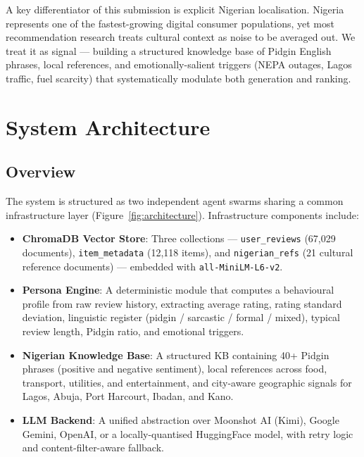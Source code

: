 \documentclass[11pt,a4paper]{article}
\begin{document}
A key differentiator of this submission is explicit Nigerian localisation. Nigeria represents one of the fastest-growing digital consumer populations, yet most recommendation research treats cultural context as noise to be averaged out. We treat it as signal — building a structured knowledge base of Pidgin English phrases, local references, and emotionally-salient triggers (NEPA outages, Lagos traffic, fuel scarcity) that systematically modulate both generation and ranking.

\section{System Architecture}

\subsection{Overview}

The system is structured as two independent agent swarms sharing a common infrastructure layer (Figure~\ref{fig:architecture}). Infrastructure components include:

\begin{itemize}[leftmargin=*]
    \item \textbf{ChromaDB Vector Store}: Three collections — \texttt{user\_reviews} (67,029 documents), \texttt{item\_metadata} (12,118 items), and \texttt{nigerian\_refs} (21 cultural reference documents) — embedded with \texttt{all-MiniLM-L6-v2}.
    \item \textbf{Persona Engine}: A deterministic module that computes a behavioural profile from raw review history, extracting average rating, rating standard deviation, linguistic register (pidgin / sarcastic / formal / mixed), typical review length, Pidgin ratio, and emotional triggers.
    \item \textbf{Nigerian Knowledge Base}: A structured KB containing 40+ Pidgin phrases (positive and negative sentiment), local references across food, transport, utilities, and entertainment, and city-aware geographic signals for Lagos, Abuja, Port Harcourt, Ibadan, and Kano.
    \item \textbf{LLM Backend}: A unified abstraction over Moonshot AI (Kimi), Google Gemini, OpenAI, or a locally-quantised HuggingFace model, with retry logic and content-filter-aware fallback.
\end{itemize}
\end{document}
